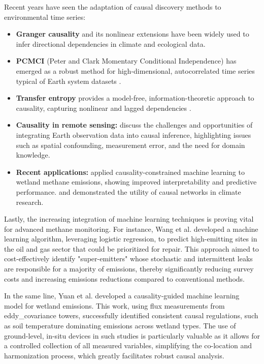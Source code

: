 Recent years have seen the adaptation of causal discovery methods to environmental time series:
\begin{itemize}
    \item \textbf{Granger causality} \cite{Granger} and its nonlinear extensions have been widely used to infer directional dependencies in climate and ecological data.
    \item \textbf{PCMCI} (Peter and Clark Momentary Conditional Independence) has emerged as a robust method for high-dimensional, autocorrelated time series typical of Earth system datasets \cite{Runge2019}.
    \item \textbf{Transfer entropy} provides a model-free, information-theoretic approach to causality, capturing nonlinear and lagged dependencies \cite{Schreiber2000}.
    \item \textbf{Causality in remote sensing:} \cite{jerzak2023} discuss the challenges and opportunities of integrating Earth observation data into causal inference, highlighting issues such as spatial confounding, measurement error, and the need for domain knowledge.
    \item \textbf{Recent applications:} \cite{Yuan2022} applied causality-constrained machine learning to wetland methane emissions, showing improved interpretability and predictive performance. \cite{Kretschmer2016} and \cite{EbertUphoff2021} demonstrated the utility of causal networks in climate research.
\end{itemize}

Lastly, the increasing integration of machine learning techniques is proving vital for advanced methane monitoring. For instance, Wang et al. \cite{wang2020} developed a machine learning algorithm, leveraging logistic regression, to predict high-emitting sites in the oil and gas sector that could be prioritized for repair. This approach aimed to cost-effectively identify "super-emitters" whose stochastic and intermittent leaks are responsible for a majority of emissions, thereby significantly reducing survey costs and increasing emissions reductions compared to conventional methods.

In the same line, Yuan et al. \cite{Yuan2022} developed a causality-guided machine learning model for wetland  emissions. This work, using flux measurements from \gls{eddy_covariance} towers, successfully identified consistent causal regulations, such as soil temperature dominating  emissions across wetland types. The use of ground-level, in-situ devices in such studies is particularly valuable as it allows for a controlled collection of all measured variables, simplifying the co-location and harmonization process, which greatly facilitates robust causal analysis. 

